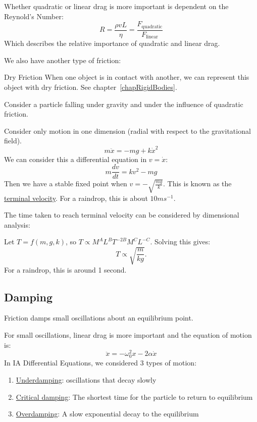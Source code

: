 \documentclass[../Main.tex]{subfiles}
\begin{document}
Whether quadratic or linear drag is more important is dependent on the Reynold's Number:
\begin{equation*}
    R = \frac{\rho v L}{\eta} = \frac{F_{\text{quadratic}}}{F_{\text{linear}}}
\end{equation*}
Which describes the relative importance of quadratic and linear drag.\par
We also have another type of friction:
\begin{definition}{Dry Friction}
    When one object is in contact with another, we can represent this object with dry friction. See chapter~\ref{chapRigidBodies}.
\end{definition}
\begin{example}
    Consider a particle falling under gravity and under the influence of quadratic friction.\par
    Consider only motion in one dimension (radial with respect to the gravitational field).
    \begin{equation*}
        m\ddot{x} = -mg + k \dot{x}^2
    \end{equation*}
    We can consider this a differential equation in $v = \dot{x}$:
    \begin{equation*}
        m\frac{dv}{dt} = kv^2 - mg
    \end{equation*}
    Then we have a stable fixed point when $v = -\sqrt{\frac{mg}{k}}$. This is known as the \underline{terminal velocity}. For a raindrop, this is about $10 m s^{-1}$.\par
    The time taken to reach terminal velocity can be considered by dimensional analysis:\par
    Let $T = f(m, g, k)$, so $T \propto M^A L^B T^{-2B} M^C L^{-C}$. Solving this gives:
    \begin{equation*}
        T \propto \sqrt{\frac{m}{kg}}.
    \end{equation*}
    For a raindrop, this is around 1 second.
\end{example}
\subsection{Damping}
Friction damps small oscillations about an equilibrium point.\par
For small oscillations, linear drag is more important and the equation of motion is:
\begin{equation}
    \ddot{x} = -\omega_0^2 x - 2\alpha\dot{x}
    \label{eqnDamptedOscillation.}
\end{equation}
In IA Differential Equations, we considered 3 types of motion:
\begin{enumerate}
    \item \underline{Underdamping}: oscillations that decay slowly
    \item \underline{Critical damping}: The shortest time for the particle to return to equilibrium
    \item \underline{Overdamping}: A slow exponential decay to the equilibrium
\end{enumerate}
\end{document}
